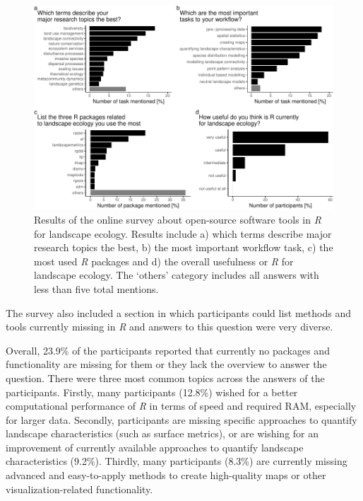 \documentclass[smallextended]{svjour3}       %
\begin{document}
\begin{figure}

{\centering \includegraphics[width=\textwidth]{paper_files/figure-latex/fig-survey-1} 

}

\caption{Results of the online survey about open-source software tools in \textit{R} for landscape ecology. Results include a) which terms describe major research topics the best, b) the most important workflow task, c) the most used \textit{R} packages and d) the overall usefulness or \textit{R} for landscape ecology. The `others' category includes all answers with less than five total mentions.}\label{fig:fig-survey}
\end{figure}

The survey also included a section in which participants could list methods and tools currently missing in \textit{R} and answers to this question were very diverse.

Overall, 23.9\% of the participants reported that currently no packages and functionality are missing for them or they lack the overview to answer the question.
There were three most common topics across the answers of the participants.
Firstly, many participants (12.8\%) wished for a better computational performance of \textit{R} in terms of speed and required RAM, especially for larger data.
Secondly, participants are missing specific approaches to quantify landscape characteristics (such as surface metrics), or are wishing for an improvement of currently available approaches to quantify landscape characteristics (9.2\%).
Thirdly, many participants (8.3\%) are currently missing advanced and easy-to-apply methods to create high-quality maps or other visualization-related functionality.
\end{document}
